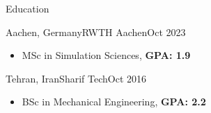 \begin{cvsection}{Education}
	\begin{cvsubsection}{Aachen, Germany}{RWTH Aachen}{Oct 2023}
		\begin{itemize}
			\item MSc in Simulation Sciences, 
			\textbf{GPA: 1.9}
		\end{itemize}
	\end{cvsubsection}

	\begin{cvsubsection}{Tehran, Iran}{Sharif Tech}{Oct 2016}
		\begin{itemize}
			\item BSc in Mechanical Engineering, 
			\textbf{GPA: 2.2}
		\end{itemize}
	\end{cvsubsection}
\end{cvsection}